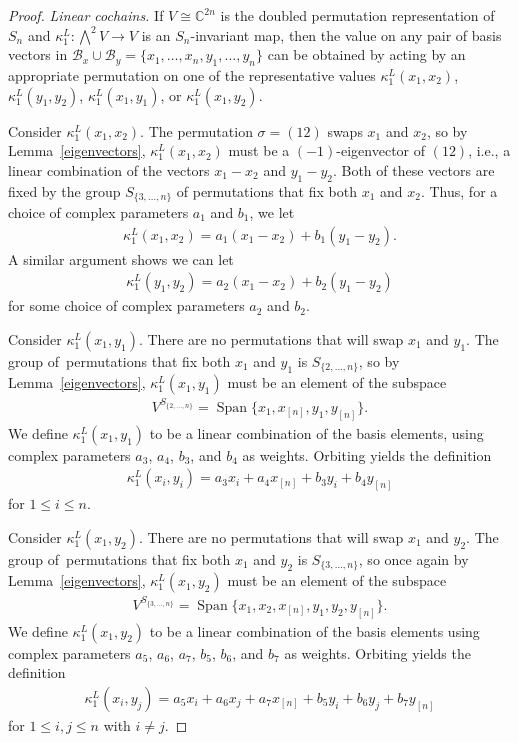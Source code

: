 \documentclass[pdftex]{sigma}
\numberwithin{equation}{section}
\DeclareMathOperator{\Span}{Span}
\begin{document}
\begin{proof}
\textit{Linear cochains.}
If $V\cong \mathbb{C}^{2n}$ is the doubled permutation representation of $S_n$
and $\kappa^L_1\colon \bigwedge^2 V\to V$ is an $S_n$-invariant map,
then the value on any pair of basis vectors in $\mathcal{B}_x \cup \mathcal{B}_y=\{x_1,\dots,x_n,y_1,\dots,y_n\}$
can be obtained by acting by an appropriate permutation on one of the representative values
$\kappa^L_1(x_1,x_2)$, $\kappa^L_1(y_1,y_2)$, $\kappa^L_1(x_1,y_1)$, or $\kappa^L_1(x_1,y_2)$.

Consider $\kappa^L_1(x_1,x_2)$. The permutation $\sigma=(12)$ swaps $x_1$ and $x_2$, so by Lemma~\ref{eigenvectors}, $\kappa^L_1(x_1,x_2)$ must be a $(-1)$-eigenvector of $(12)$, i.e.,
a linear combination of the vectors $x_1-x_2$ and $y_1-y_2$. Both of these vectors are fixed by the group $S_{\{3,\ldots,n\}}$ of permutations that fix
both $x_1$ and $x_2$. Thus, for a choice of complex parameters $a_1$ and $b_1$,
we let
\begin{gather*}
\kappa^L_1(x_1,x_2)=a_1(x_1-x_2)+b_1(y_1-y_2).
\end{gather*}
A similar argument shows we can let
\begin{gather*}
\kappa^L_1(y_1,y_2)=a_2(x_1-x_2)+b_2(y_1-y_2)
\end{gather*}
for some choice of complex parameters $a_2$ and $b_2$.

Consider $\kappa^L_1(x_1,y_1)$. There are no permutations that will swap $x_1$ and $y_1$. The group of~per\-mu\-tations that fix both $x_1$ and $y_1$ is $S_{\{2,\ldots,n\}}$, so by Lemma~\ref{eigenvectors},
$\kappa^L_1(x_1,y_1)$ must be an element of the subspace
\begin{gather*}
V^{S_{\{2,\ldots,n\}}}=\Span\big\{x_1, x_{[n]}, y_1, y_{[n]}\big\}.
\end{gather*}
We define $\kappa^L_1(x_1,y_1)$ to be a linear combination of the basis elements, using complex parameters $a_3$, $a_4$, $b_3$, and $b_4$ as weights.
Orbiting yields the definition
\begin{gather*}
\kappa^L_1(x_i,y_i)=a_3x_i+a_4x_{[n]}+b_3y_i+b_4y_{[n]}
\end{gather*}
for $1\leq i\leq n$.

Consider $\kappa^L_1(x_1,y_2)$. There are no permutations that will swap $x_1$ and $y_2$. The group of~per\-mu\-tations that fix both $x_1$ and $y_2$ is $S_{\{3,\ldots,n\}}$, so once again by Lemma~\ref{eigenvectors}, $\kappa^L_1(x_1,y_2)$ must be an element of
the subspace
\begin{gather*}
V^{S_{\{3,\ldots,n\}}}=\Span\big\{x_1,x_2, x_{[n]}, y_1, y_2, y_{[n]}\big\}.
\end{gather*}
We define $\kappa^L_1(x_1,y_2)$ to be a linear combination of the basis elements using complex parameters $a_5$, $a_6$, $a_7$, $b_5$, $b_6$, and $b_7$ as weights.
Orbiting yields the definition
\begin{gather*}
\kappa^L_1(x_i,y_j)=a_5x_i+a_6x_j+a_7x_{[n]}+b_5y_i+b_6y_j+b_7y_{[n]}
\end{gather*}
for $1\leq i,j\leq n$ with $i\neq j$.


\end{proof}
\end{document}
